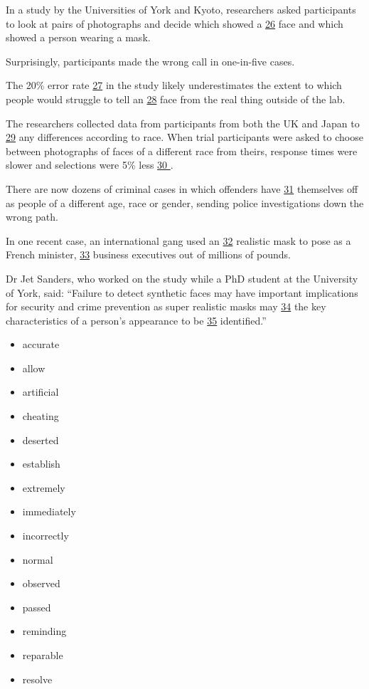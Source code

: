 \documentclass[UTF8,11pt]{ctexart}
\begin{document}
In a study by the Universities of York and Kyoto, researchers asked participants to look at pairs of photographs and decide which showed a \uline{26} face and which showed a person wearing a mask.


Surprisingly, participants made the wrong call in one-in-five cases.


The 20\% error rate \uline{27} in the study likely underestimates the extent to which people would struggle to tell an \uline{28} face from the real thing outside of the lab.


The researchers collected data from participants from both the UK and Japan to \uline{29} any differences according to race. When trial participants were asked to choose between photographs of faces of a different race from theirs, response times were slower and selections were 5\% less \uline{30 }.


There are now dozens of criminal cases in which offenders have \uline{31} themselves off as people of a different age, race or gender, sending police investigations down the wrong path.


In one recent case, an international gang used an \uline{32} realistic mask to pose as a French minister, \uline{33} business executives out of millions of pounds.


Dr Jet Sanders, who worked on the study while a PhD student at the University of York, said: “Failure to detect synthetic faces may have important implications for security and crime prevention as super realistic masks may \uline{34} the key characteristics of a person’s appearance to be \uline{35} identified.”


\begin{itemize}[leftmargin=2em,itemsep=.2em,topsep=.4em]\item[A.] accurate
\item[B.] allow
\item[C.] artificial
\item[D.] cheating
\item[E.] deserted
\item[F.] establish
\item[G.] extremely
\item[H.] immediately
\item[I.] incorrectly
\item[J.] normal
\item[K.] observed
\item[L.] passed
\item[M.] reminding
\item[N.] reparable
\item[O.] resolve
\end{itemize}
\end{document}
